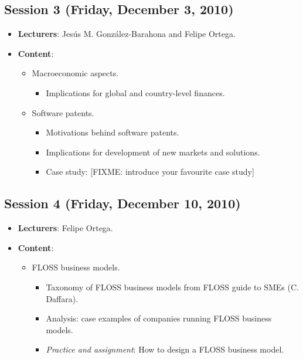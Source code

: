 \documentclass[a4paper]{article}
\begin{document}
\subsection{Session 3 (Friday, December 3, 2010)}

\begin{itemize}
 \item \textbf{Lecturers}: Jesús M. González-Barahona and Felipe Ortega.

 \item \textbf{Content}:

    \begin{itemize}
     \item Macroeconomic aspects.
      \begin{itemize}
       \item Implications for global and country-level finances.
       
      \end{itemize}

     \item Software patents.
	\begin{itemize}
	 \item Motivations behind software patents.
	 \item Implications for development of new markets and solutions.
         \item Case study: [FIXME: introduce your favourite case study]
	\end{itemize}

    \end{itemize}

\end{itemize}

\subsection{Session 4 (Friday, December 10, 2010)}

\begin{itemize}
 \item \textbf{Lecturers}: Felipe Ortega.

 \item \textbf{Content}:

    \begin{itemize}
     \item FLOSS business models.
      \begin{itemize}
       \item Taxonomy of FLOSS business models from FLOSS guide to SMEs (C. Daffara).
       \item Analysis: case examples of companies running FLOSS business models.
       \item \textit{Practice and assignment}: How to design a FLOSS business model.
      \end{itemize}

  \end{itemize}
\end{itemize}
\end{document}
